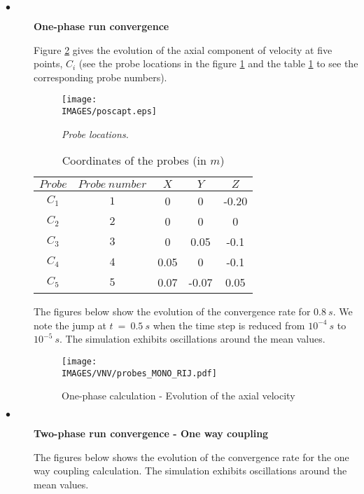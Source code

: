 \begin{description}

   \item[$\bullet$]\textbf{One-phase run convergence}

Figure \ref{transit_cycl} gives the evolution of the axial component of velocity at five points, $C_i$ (see the probe locations in the figure \ref{local_cycl} and the table \ref{tab1_cycl} to see the corresponding probe numbers).

\parbox{0.55\textwidth}{
\begin{figure}[H]
\centerline{\texttt{[image: \\IMAGES/poscapt.eps]}}
\caption{\textit{Probe locations.}\label{local_cycl}}
\end{figure}}
\parbox{0.35\textwidth}{
\begin{table}[H]
\begin{center}
\begin{tabular}{|c|c|ccc|}
\hline
$Probe$ & $Probe~number$ & $X$ & $Y$ & $Z$ \\
\hline
$C_1$&$1$&0&0&-0.20\\
\hline
$C_2$&$2$&0&0&0\\
\hline
$C_3$&$3$&0&0.05&-0.1\\
\hline
$C_4$&$4$&0.05&0&-0.1\\
\hline
$C_5$&$5$&0.07&-0.07&0.05\\
\hline
\end{tabular}
\caption{Coordinates of the probes (in $m$)\label{tab1_cycl}}
\end{center}
\end{table}}

The figures below show the evolution of the convergence rate for $0.8~s$. We note the jump at $t~=~0.5~s$ when the time step is reduced from $10^{-4}~s$ to $10^{-5}~s$. The simulation exhibits oscillations around the mean values. 

\begin{figure}[H]
\centerline{\texttt{[image: \\IMAGES/VNV/probes\_MONO\_RIJ.pdf]}}
\caption{One-phase calculation - Evolution of the axial velocity}
\label{transit_cycl}
\end{figure}

   \item[$\bullet$]\textbf{Two-phase run convergence - One way coupling}

The figures below shows the evolution of the convergence rate for the one way coupling calculation. The simulation exhibits oscillations around the mean values. 


\end{description}
